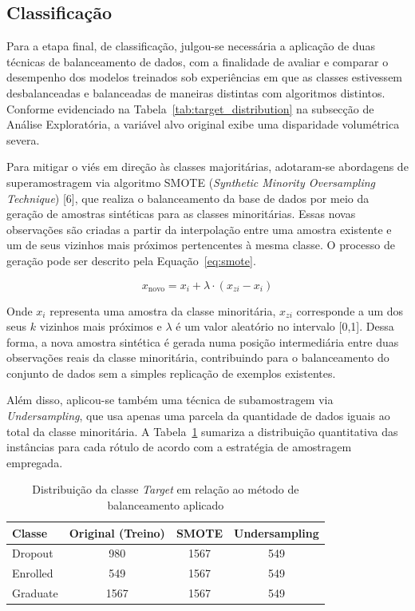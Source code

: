 \subsection{Classificação}
Para a etapa final, de classificação, julgou-se necessária a aplicação de duas técnicas de balanceamento de dados, com a finalidade de avaliar e comparar o desempenho dos modelos treinados sob experiências em que as classes estivessem desbalanceadas e balanceadas de maneiras distintas com algoritmos distintos. Conforme evidenciado na Tabela~\ref{tab:target_distribution} na subsecção de Análise Exploratória, a variável alvo original exibe uma disparidade volumétrica severa. 

Para mitigar o viés em direção às classes majoritárias, adotaram-se abordagens de superamostragem via algoritmo SMOTE (\textit{Synthetic Minority Oversampling Technique}) [6], que realiza o balanceamento da base de dados por meio da geração de amostras sintéticas para as classes minoritárias. Essas novas observações são criadas a partir da interpolação entre uma amostra existente e um de seus vizinhos mais próximos pertencentes à mesma classe. O processo de geração pode ser descrito pela Equação~\ref{eq:smote}.

\begin{equation}
\label{eq:smote}
x_{\text{novo}} = x_i + \lambda \cdot (x_{zi} - x_i)
\end{equation}

Onde $x_i$ representa uma amostra da classe minoritária, $x_{zi}$ corresponde a um dos seus $k$ vizinhos mais próximos e $\lambda$ é um valor aleatório no intervalo [0,1]. Dessa forma, a nova amostra sintética é gerada numa posição intermediária entre duas observações reais da classe minoritária, contribuindo para o balanceamento do conjunto de dados sem a simples replicação de exemplos existentes.

Além disso, aplicou-se também uma técnica de subamostragem via \textit{Undersampling}, que usa apenas uma parcela da quantidade de dados iguais ao total da classe minoritária. A Tabela~\ref{tab:balanceamento} sumariza a distribuição quantitativa das instâncias para cada rótulo de acordo com a estratégia de amostragem empregada.

\begin{table}[htbp]
\caption{Distribuição da classe \textit{Target} em relação ao método de balanceamento aplicado}
\label{tab:balanceamento}
\centering
\footnotesize
\begin{tabular}{lccc}
\hline
\textbf{Classe} & \textbf{Original (Treino)} & \textbf{SMOTE} & \textbf{Undersampling} \\
\hline
Dropout  & 980  & 1567 & 549 \\
Enrolled & 549  & 1567 & 549 \\
Graduate & 1567 & 1567 & 549 \\
\hline
\end{tabular}
\end{table}

